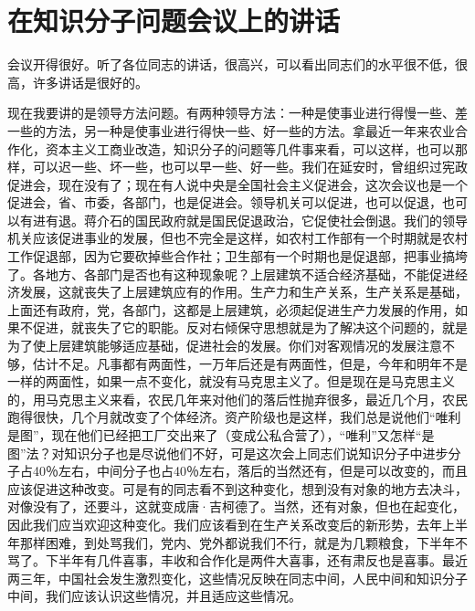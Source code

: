 \section[在知识分子问题会议上的讲话（一九五六年一月二十日）]{在知识分子问题会议上的讲话}


会议开得很好。听了各位同志的讲话，很高兴，可以看出同志们的水平很不低，很高，许多讲话是很好的。

现在我要讲的是领导方法问题。有两种领导方法：一种是使事业进行得慢一些、差一些的方法，另一种是使事业进行得快一些、好一些的方法。拿最近一年来农业合作化，资本主义工商业改造，知识分子的问题等几件事来看，可以这样，也可以那样，可以迟一些、坏一些，也可以早一些、好一些。我们在延安时，曾组织过宪政促进会，现在没有了；现在有人说中央是全国社会主义促进会，这次会议也是一个促进会，省、市委，各部门，也是促进会。领导机关可以促进，也可以促退，也可以有进有退。蒋介石的国民政府就是国民促退政治，它促使社会倒退。我们的领导机关应该促进事业的发展，但也不完全是这样，如农村工作部有一个时期就是农村工作促退部，因为它要砍掉些合作社；卫生部有一个时期也是促退部，把事业搞垮了。各地方、各部门是否也有这种现象呢？上层建筑不适合经济基础，不能促进经济发展，这就丧失了上层建筑应有的作用。生产力和生产关系，生产关系是基础，上面还有政府，党，各部门，这都是上层建筑，必须起促进生产力发展的作用，如果不促进，就丧失了它的职能。反对右倾保守思想就是为了解决这个问题的，就是为了使上层建筑能够适应基础，促进社会的发展。你们对客观情况的发展注意不够，估计不足。凡事都有两面性，一万年后还是有两面性，但是，今年和明年不是一样的两面性，如果一点不变化，就没有马克思主义了。但是现在是马克思主义的，用马克思主义来看，农民几年来对他们的落后性抛弃很多，最近几个月，农民跑得很快，几个月就改变了个体经济。资产阶级也是这样，我们总是说他们“唯利是图”，现在他们已经把工厂交出来了（变成公私合营了），“唯利”又怎样“是图”法？对知识分子也是尽说他们不好，可是这次会上同志们说知识分子中进步分子占40％左右，中间分子也占40％左右，落后的当然还有，但是可以改变的，而且应该促进这种改变。可是有的同志看不到这种变化，想到没有对象的地方去决斗，对像没有了，还要斗，这就变成唐·吉柯德了。当然，还有对象，但也在起变化，因此我们应当欢迎这种变化。我们应该看到在生产关系改变后的新形势，去年上半年那样困难，到处骂我们，党内、党外都说我们不行，就是为几颗粮食，下半年不骂了。下半年有几件喜事，丰收和合作化是两件大喜事，还有肃反也是喜事。最近两三年，中国社会发生激烈变化，这些情况反映在同志中间，人民中间和知识分子中间，我们应该认识这些情况，并且适应这些情况。

